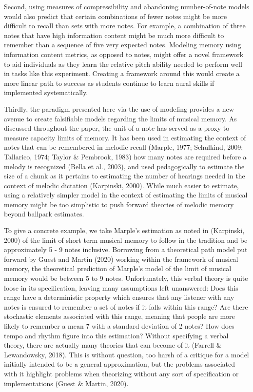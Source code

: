 \documentclass[english,man,floatsintext]{apa6}
\begin{document}
Second, using measures of compressibility and abandoning number-of-note models would also predict that certain combinations of fewer notes might be more difficult to recall than sets with more notes.
For example, a combination of three notes that have high information content might be much more difficult to remember than a sequence of five very expected notes. Modeling memory using information content metrics, as opposed to notes, might offer a novel framework to aid individuals as they learn the relative pitch ability needed to perform well in tasks like this experiment.
Creating a framework around this would create a more linear path to success as students continue to learn aural skills if implemented systematically.

Thirdly, the paradigm presented here via the use of modeling provides a new avenue to create falsifiable models regarding the limits of musical memory.
As discussed throughout the paper, the unit of a note has served as a proxy to measure capacity limits of memory. It has been used in estimating the context of notes that can be remembered in melodic recall (Marple, 1977; Schulkind, 2009; Tallarico, 1974; Taylor \& Pembrook, 1983) how many notes are required before a melody is recognized (Bella et al., 2003), and used pedagogically to estimate the size of a chunk as it pertains to estimating the number of hearings needed in the context of melodic dictation (Karpinski, 2000).
While much easier to estimate, using a relatively simpler model in the context of estimating the limits of musical memory might be too simplistic to push forward theories of melodic memory beyond ballpark estimates.

To give a concrete example, we take Marple's estimation as noted in (Karpinski, 2000) of the limit of short term musical memory to follow in the tradition and be approximately 5 - 9 notes inclusive.
Borrowing from a theoretical path model put forward by Guest and Martin (2020) working within the framework of musical memory, the theoretical prediction of Marple's model of the limit of musical memory would be between 5 to 9 notes.
Unfortunately, this verbal theory is quite loose in its specification, leaving many assumptions left unanswered:
Does this range have a deterministic property which ensures that any listener with any notes is ensured to remember a set of notes if it falls within this range?
Are there stochastic elements associated with this range, meaning that people are more likely to remember a mean 7 with a standard deviation of 2 notes?
How does tempo and rhythm figure into this estimation?
Without specifying a verbal theory, there are actually many theories that can become of it (Farrell \& Lewandowsky, 2018).
This is without question, too harsh of a critique for a model initially intended to be a general approximation, but the problems associated with it highlight problems when theorizing without any sort of specification or implementations (Guest \& Martin, 2020).
\end{document}
